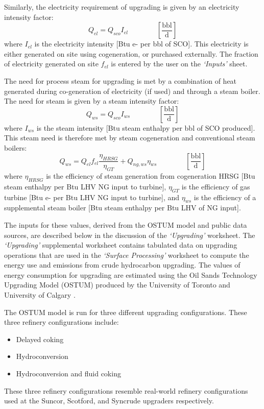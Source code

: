 \documentclass[11pt]{report}
\newcommand{\sheet}[1]{\textit{`{#1}'}}
\newcommand{\eqnunitfrac}[2]{\quad\quad \scriptstyle{\left[\frac{\text{#1}}{\text{#2}}\right]}}
\begin{document}
Similarly, the electricity requirement of upgrading is given by an electricity intensity factor:
\begin{equation}
Q_{el} = Q_{sco}I_{el} \quad\quad\eqnunitfrac{bbl}{d}
\end{equation}
where $I_{el}$ is the electricity intensity [Btu e- per bbl of SCO].  This electricity is either generated on site using cogeneration, or purchased externally. The fraction of electricity generated on site $f_{el}$ is entered by the user on the \sheet{Inputs} sheet.  

The need for process steam for upgrading is met by a combination of heat generated during co-generation of electricity (if used) and through a steam boiler.  The need for steam is given by a steam intensity factor:
\begin{equation}
Q_{ws} = Q_{sco}I_{ws} \quad\quad\eqnunitfrac{bbl}{d}
\end{equation}
where $I_{ws}$ is the steam intensity [Btu steam enthalpy per bbl of SCO produced].  This steam need is therefore met by steam cogeneration and conventional steam boilers:
\begin{equation}
Q_{ws} = Q_{el}f_{el}\frac{\eta_{HRSG}}{\eta_{GT}} + Q_{ng,ws}\eta_{ws} \quad\quad\eqnunitfrac{bbl}{d}
\end{equation}
where $\eta_{HRSG}$ is the efficiency of steam generation from cogeneration HRSG [Btu steam enthalpy per Btu LHV NG input to turbine], $\eta_{GT}$ is the efficiency of gas turbine [Btu e- per Btu LHV NG input to turbine], and $\eta_{ws}$ is the efficiency of a supplemental steam boiler [Btu steam enthalpy per Btu LHV of NG input].

The inputs for these values, derived from the OSTUM model and public data sources, are described below in the discussion of the \sheet{Upgrading} worksheet.
The \sheet{Upgrading} supplemental worksheet contains tabulated data on upgrading operations that are used in the \sheet{Surface Processing} worksheet to compute the energy use and emissions from crude hydrocarbon upgrading.  The values of energy consumption for upgrading are estimated using the Oil Sands Technology Upgrading Model (OSTUM) produced by the University of Toronto and University of Calgary \cite{OSTUM2016}.

The OSTUM model is run for three different upgrading configurations.  These three refinery configurations include:
\begin{itemize}
\item Delayed coking
\item Hydroconversion
\item Hydroconversion and fluid coking
\end{itemize}
These three refinery configurations resemble real-world refinery configurations used at the Suncor, Scotford, and Syncrude upgraders respectively.
\end{document}
